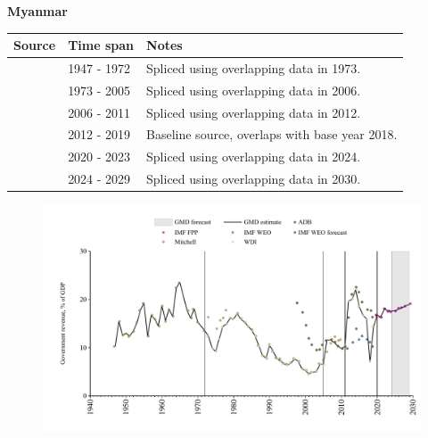 \documentclass[12pt,a4paper,landscape]{article}
\begin{document}
\begin{adjustbox}{max totalsize={\paperwidth}{\paperheight},center}
\begin{minipage}[t][\textheight][t]{\textwidth}
\vspace*{0.5cm}
{}
\begin{center}
{\Large\bfseries Myanmar}
\end{center}
\vspace{0.5cm}
\begin{table}[H]
\centering
\small
\begin{tabular}{|l|l|l|}
\hline
\textbf{Source} & \textbf{Time span} & \textbf{Notes} \\
\hline
\rowcolor{white}\cite{Mitchell}& 1947 - 1972 &Spliced using overlapping data in 1973.\\
\rowcolor{lightgray}\cite{WDI}& 1973 - 2005 &Spliced using overlapping data in 2006.\\
\rowcolor{white}\cite{IMF_WEO}& 2006 - 2011 &Spliced using overlapping data in 2012.\\
\rowcolor{lightgray}\cite{WDI}& 2012 - 2019 &Baseline source, overlaps with base year 2018.\\
\rowcolor{white}\cite{IMF_FPP}& 2020 - 2023 &Spliced using overlapping data in 2024.\\
\rowcolor{lightgray}\cite{IMF_WEO_forecast}& 2024 - 2029 &Spliced using overlapping data in 2030.\\
\hline
\end{tabular}
\end{table}
\begin{figure}[H]
\centering
\includegraphics[width=\textwidth,height=0.6\textheight,keepaspectratio]{graphs/MMR_govrev_GDP.pdf}
\end{figure}
\end{minipage}
\end{adjustbox}
\end{document}
